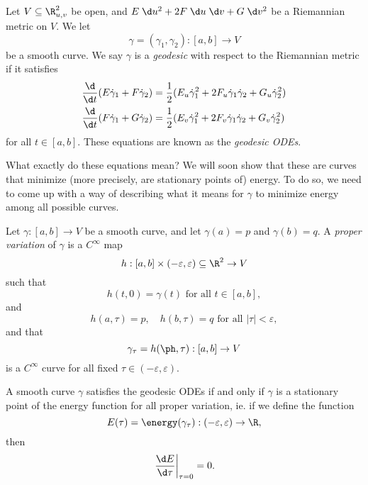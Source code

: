 \documentclass[a4paper]{article}
\begin{document}
\begin{defi}[Geodesic]
  Let $V \subseteq \R_{u, v}^2$ be open, and $E \;\d u^2 + 2F \;\d u\;\d v + G \;\d v^2$ be a Riemannian metric on $V$. We let
  \[
    \gamma = (\gamma_1, \gamma_2): [a, b] \to V
  \]
  be a smooth curve. We say $\gamma$ is a \emph{geodesic} with respect to the Riemannian metric if it satisfies
  \begin{align*}
    \frac{\d}{\d t}(E \dot{\gamma}_1 + F \dot{\gamma}_2) &= \frac{1}{2}(E_u \dot{\gamma}_1^2 + 2 F_u \dot{\gamma}_1\dot{\gamma}_2 + G_u \dot{\gamma}_2^2)\\
    \frac{\d}{\d t}(F \dot{\gamma}_1 + G \dot{\gamma}_2) &= \frac{1}{2}(E_v \dot{\gamma}_1^2 + 2 F_v \dot{\gamma}_1\dot{\gamma}_2 + G_v \dot{\gamma}_2^2)
  \end{align*}
  for all $t \in [a, b]$. These equations are known as the \emph{geodesic ODEs}.
\end{defi}
What exactly do these equations mean? We will soon show that these are curves that minimize (more precisely, are stationary points of) energy. To do so, we need to come up with a way of describing what it means for $\gamma$ to minimize energy among all possible curves.

\begin{defi}
  Let $\gamma: [a, b] \to V$ be a smooth curve, and let $\gamma(a) = p$ and $\gamma(b) = q$. A \emph{proper variation} of $\gamma$ is a $C^\infty$ map
  \[
    h: [a, b] \times (-\varepsilon, \varepsilon) \subseteq \R^2 \to V
  \]
  such that
  \[
    h(t, 0) = \gamma(t)\text{ for all }t \in [a, b],
  \]
  and
  \[
    h(a, \tau) = p,\quad h(b, \tau) = q\text{ for all }|\tau| < \varepsilon,
  \]
  and that
  \[
    \gamma_\tau = h(\ph, \tau): [a, b] \to V
  \]
  is a $C^\infty$ curve for all fixed $\tau \in (-\varepsilon, \varepsilon)$.
\end{defi}

\begin{prop}
  A smooth curve $\gamma$ satisfies the geodesic ODEs if and only if $\gamma$ is a stationary point of the energy function for all proper variation, ie. if we define the function
  \[
    E(\tau) = \energy(\gamma_\tau): (-\varepsilon, \varepsilon) \to \R,
  \]
  then
  \[
    \left.\frac{\d E}{\d \tau} \right|_{\tau = 0} = 0.
  \]
\end{prop}
\end{document}
